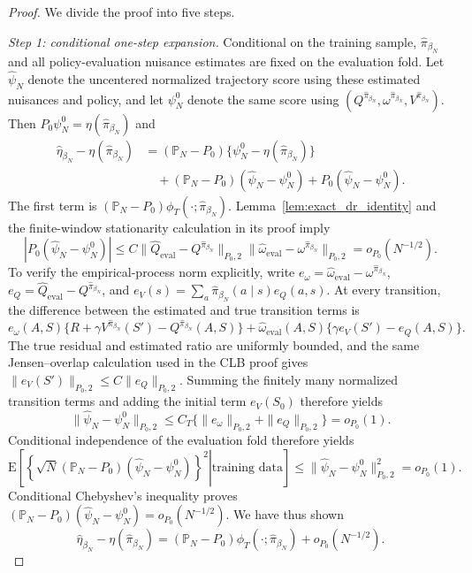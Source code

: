 \documentclass[12pt]{article}
\theoremstyle{remark}\newtheorem{remark}[theorem]{Remark}\theoremstyle{plain}
\newcommand{\E}{\mathrm{E}}
\begin{document}
\begin{proof}
    We divide the proof into five steps.

    \emph{Step 1: conditional one-step expansion.}
    Conditional on the training sample,
    $\widehat\pi_{\beta_N}$ and all policy-evaluation nuisance
    estimates are fixed on the evaluation fold.  Let
    $\widehat\psi_N$ denote the uncentered normalized trajectory score
    using these estimated nuisances and policy, and let
    $\psi_N^0$ denote the same score using
    $(Q^{\widehat\pi_{\beta_N}},
      \omega^{\widehat\pi_{\beta_N}},
      V^{\widehat\pi_{\beta_N}})$.
    Then
    $P_0\psi_N^0=\eta(\widehat\pi_{\beta_N})$ and
    \[
        \begin{aligned}
        \widehat\eta_{\beta_N}
        -\eta(\widehat\pi_{\beta_N})
        &=(\mathbb P_N-P_0)
        \{\psi_N^0-\eta(\widehat\pi_{\beta_N})\}\\
        &\quad+
        (\mathbb P_N-P_0)(\widehat\psi_N-\psi_N^0)
        +P_0(\widehat\psi_N-\psi_N^0).
        \end{aligned}
    \]
    The first term is
    $(\mathbb P_N-P_0)
      \phi_T(\cdot;\widehat\pi_{\beta_N})$.
    Lemma~\ref{lem:exact_dr_identity} and the finite-window
    stationarity calculation in its proof imply
    \[
        |P_0(\widehat\psi_N-\psi_N^0)|
        \leq C
        \|\widehat Q_{\mathrm{eval}}
        -Q^{\widehat\pi_{\beta_N}}\|_{P_0,2}
        \|\widehat\omega_{\mathrm{eval}}
        -\omega^{\widehat\pi_{\beta_N}}\|_{P_0,2}
        =o_{P_0}(N^{-1/2}).
    \]
    To verify the empirical-process norm explicitly, write
    $e_\omega=\widehat\omega_{\mathrm{eval}}
      -\omega^{\widehat\pi_{\beta_N}}$,
    $e_Q=\widehat Q_{\mathrm{eval}}
      -Q^{\widehat\pi_{\beta_N}}$, and
    $e_V(s)=\sum_a\widehat\pi_{\beta_N}(a\mid s)e_Q(a,s)$.
    At every transition, the difference between the estimated and
    true transition terms is
    \[
        e_\omega(A,S)
        \{R+\gamma V^{\widehat\pi_{\beta_N}}(S')
          -Q^{\widehat\pi_{\beta_N}}(A,S)\}
        +
        \widehat\omega_{\mathrm{eval}}(A,S)
        \{\gamma e_V(S')-e_Q(A,S)\}.
    \]
    The true residual and estimated ratio are uniformly bounded, and
    the same Jensen--overlap calculation used in the CLB proof gives
    $\|e_V(S')\|_{P_0,2}\leq C\|e_Q\|_{P_0,2}$.
    Summing the finitely many normalized transition terms and adding
    the initial term $e_V(S_0)$ therefore yields
    \[
        \|\widehat\psi_N-\psi_N^0\|_{P_0,2}
        \leq C_T\{\|e_\omega\|_{P_0,2}
          +\|e_Q\|_{P_0,2}\}
        =o_{P_0}(1).
    \]
    Conditional independence of the evaluation fold therefore yields
    \[
        \E\!\left[
        \left.
        \left\{\sqrt N(\mathbb P_N-P_0)
        (\widehat\psi_N-\psi_N^0)\right\}^2
        \right|\text{training data}\right]
        \leq
        \|\widehat\psi_N-\psi_N^0\|_{P_0,2}^2
        =o_{P_0}(1).
    \]
    Conditional Chebyshev's inequality proves
    $(\mathbb P_N-P_0)(\widehat\psi_N-\psi_N^0)
      =o_{P_0}(N^{-1/2})$.  We have thus shown
    \[
        \widehat\eta_{\beta_N}
        -\eta(\widehat\pi_{\beta_N})
        =
        (\mathbb P_N-P_0)
        \phi_T(\cdot;\widehat\pi_{\beta_N})
        +o_{P_0}(N^{-1/2}).
    \]


\end{proof}
\end{document}
